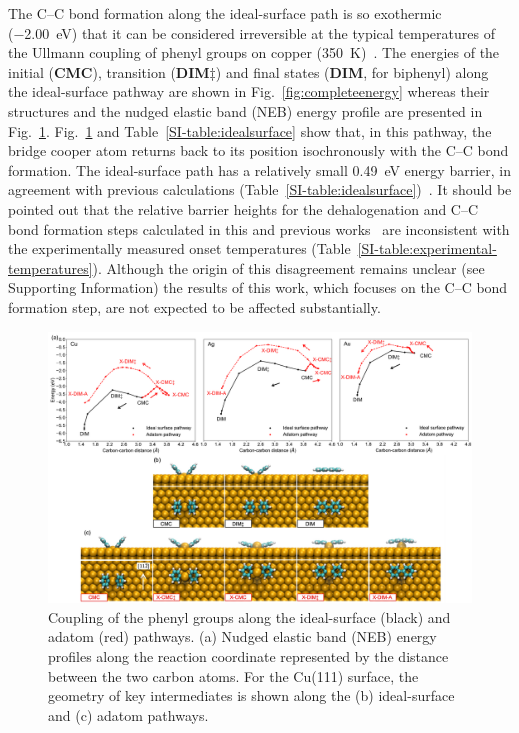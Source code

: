 \documentclass[aps,prb,amsmath,amssymb,11pt]{revtex4-1}
\newcommand{\sinfo}{Supporting Information}
\newcommand{\zhzh}{\color{blue}}
\begin{document}
The C--C bond formation along the ideal-surface path is so exothermic (\SI{-2.00}{\electronvolt}) that it can be considered irreversible at the typical temperatures of the Ullmann coupling of phenyl groups on copper (\SI{350}{\kelvin})~\cite{ullmann_67, sur_sci01}. The energies of the initial (\textbf{CMC}), transition (\textbf{DIM$\ddagger$}) and final states (\textbf{DIM}, for biphenyl) along the ideal-surface pathway are shown in Fig.~\ref{fig:completeenergy} whereas their structures and the nudged elastic band (NEB) energy profile are presented in Fig.~\ref{fig:distance-energy-main}. 
Fig.~\ref{fig:distance-energy-main} and Table~\ref{SI-table:idealsurface} show that, in this pathway, the bridge cooper atom returns back to its position isochronously with the C--C bond formation. 
The ideal-surface path has a relatively small \SI{0.49}{\electronvolt} energy barrier, in agreement with previous calculations (Table~\ref{SI-table:idealsurface})~\cite{pccp2010, jacs2013}. %
%
{\zhzh It should be pointed out that the relative barrier heights for the dehalogenation and C--C bond formation steps calculated in this and previous works~\cite{pccp2010, jacs2013} are inconsistent with the experimentally measured onset temperatures (Table~\ref{SI-table:experimental-temperatures}). Although the origin of this disagreement remains unclear (see \sinfo) the results of this work, which focuses on the C--C bond formation step, are not expected to be affected substantially.}

\begin{figure}[bt]
\centering
\includegraphics[width=1.0\textwidth]{Fig/distance-energy-main.pdf}
\caption{Coupling of the phenyl groups along the ideal-surface (black) and adatom (red) pathways. (a) Nudged elastic band (NEB) energy profiles along the reaction coordinate represented by the distance between the two carbon atoms. For the Cu(111) surface, the geometry of key intermediates is shown along the (b) ideal-surface and (c) adatom pathways.}
\label{fig:distance-energy-main}
\end{figure}
\end{document}
